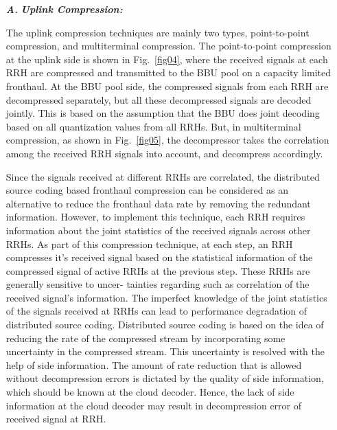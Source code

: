 \begin{multicols}{2}
\begin{itemize}
\item[{\textit{\textbf{ A.}}}] {\textit{\textbf{Uplink Compression:}}}

The uplink compression techniques are mainly two types, point-to-point compression, and multiterminal compression. The point-to-point compression at the uplink side is shown in Fig.~\ref{fig04}, where the received signals at each RRH are compressed and transmitted to the BBU pool on a capacity limited fronthaul. At the BBU pool side, the compressed signals from each RRH are decompressed separately, but all these decompressed signals are decoded jointly. This is based on the assumption that the BBU does joint decoding based on all quantization values from all RRHs. But, in multiterminal compression, as shown in Fig.~\ref{fig05}, the decompressor takes the correlation among the received RRH signals into account, and decompress accordingly.

Since the signals received at different RRHs are correlated, the distributed source coding based fronthaul compression can be considered as an alternative to reduce the fronthaul data rate by removing the redundant information. However, to implement this technique, each RRH requires information about the joint statistics of the received signals across other RRHs. As part of this compression technique, at each step, an RRH compresses it’s received signal based on the statistical information of the compressed signal of active RRHs at the previous step. These RRHs are generally sensitive to uncer- tainties regarding such as correlation of the received signal’s information. The imperfect knowledge of the joint statistics of the signals received at RRHs can lead to performance degradation of distributed source coding. Distributed source coding is based on the idea of reducing the rate of the compressed stream by incorporating some uncertainty in the compressed stream. This uncertainty is resolved with the help of side information. The amount of rate reduction that is allowed without decompression errors is dictated by the quality of side information, which should be known at the cloud decoder. Hence, the lack of side information at the cloud decoder may result in decompression error of received signal at RRH.


\end{itemize}
\end{multicols}
